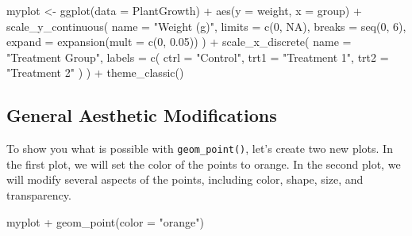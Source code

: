 \documentclass[
  letterpaper,
  DIV=11,
  numbers=noendperiod]{scrartcl}
\newenvironment{Shaded}{\begin{snugshade}}{\end{snugshade}}
\newcommand{\AttributeTok}[1]{\textcolor[rgb]{0.40,0.45,0.13}{#1}}
\newcommand{\ConstantTok}[1]{\textcolor[rgb]{0.56,0.35,0.01}{#1}}
\newcommand{\DecValTok}[1]{\textcolor[rgb]{0.68,0.00,0.00}{#1}}
\newcommand{\FloatTok}[1]{\textcolor[rgb]{0.68,0.00,0.00}{#1}}
\newcommand{\FunctionTok}[1]{\textcolor[rgb]{0.28,0.35,0.67}{#1}}
\newcommand{\NormalTok}[1]{\textcolor[rgb]{0.00,0.23,0.31}{#1}}
\newcommand{\OtherTok}[1]{\textcolor[rgb]{0.00,0.23,0.31}{#1}}
\newcommand{\SpecialCharTok}[1]{\textcolor[rgb]{0.37,0.37,0.37}{#1}}
\newcommand{\StringTok}[1]{\textcolor[rgb]{0.13,0.47,0.30}{#1}}
\begin{document}
\begin{Shaded}
\begin{Highlighting}[]
\NormalTok{myplot }\OtherTok{\textless{}{-}} \FunctionTok{ggplot}\NormalTok{(}\AttributeTok{data =}\NormalTok{ PlantGrowth) }\SpecialCharTok{+}
  \FunctionTok{aes}\NormalTok{(}\AttributeTok{y =}\NormalTok{ weight, }\AttributeTok{x =}\NormalTok{ group) }\SpecialCharTok{+}
  \FunctionTok{scale\_y\_continuous}\NormalTok{(}
    \AttributeTok{name =} \StringTok{"Weight (g)"}\NormalTok{,}
    \AttributeTok{limits =} \FunctionTok{c}\NormalTok{(}\DecValTok{0}\NormalTok{, }\ConstantTok{NA}\NormalTok{),}
    \AttributeTok{breaks =} \FunctionTok{seq}\NormalTok{(}\DecValTok{0}\NormalTok{, }\DecValTok{6}\NormalTok{),}
    \AttributeTok{expand =} \FunctionTok{expansion}\NormalTok{(}\AttributeTok{mult =} \FunctionTok{c}\NormalTok{(}\DecValTok{0}\NormalTok{, }\FloatTok{0.05}\NormalTok{))}
\NormalTok{  ) }\SpecialCharTok{+}
  \FunctionTok{scale\_x\_discrete}\NormalTok{(}
    \AttributeTok{name =} \StringTok{"Treatment Group"}\NormalTok{,}
    \AttributeTok{labels =} \FunctionTok{c}\NormalTok{(}
      \AttributeTok{ctrl =} \StringTok{"Control"}\NormalTok{, }
      \AttributeTok{trt1 =} \StringTok{"Treatment 1"}\NormalTok{, }
      \AttributeTok{trt2 =} \StringTok{"Treatment 2"}
\NormalTok{    )}
\NormalTok{  ) }\SpecialCharTok{+}
  \FunctionTok{theme\_classic}\NormalTok{()}
\end{Highlighting}
\end{Shaded}

\hypertarget{general-aesthetic-modifications}{%
\subsection{General Aesthetic
Modifications}\label{general-aesthetic-modifications}}

To show you what is possible with \texttt{geom\_point()}, let's create
two new plots. In the first plot, we will set the color of the points to
orange. In the second plot, we will modify several aspects of the
points, including color, shape, size, and transparency.

\begin{Shaded}
\begin{Highlighting}[]
\NormalTok{myplot }\SpecialCharTok{+}
  \FunctionTok{geom\_point}\NormalTok{(}\AttributeTok{color =} \StringTok{"orange"}\NormalTok{)}
\end{Highlighting}
\end{Shaded}
\end{document}

